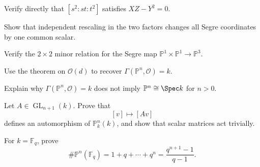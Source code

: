 \begin{exercise}\label{exr:vi36-20}
Verify directly that \([s^2:st:t^2]\) satisfies \(XZ-Y^2=0\).
\end{exercise}

\begin{exercise}\label{exr:vi36-21}
Show that independent rescaling in the two factors changes all Segre coordinates by one common scalar.
\end{exercise}

\begin{exercise}\label{exr:vi36-22}
Verify the \(2\times2\) minor relation for the Segre map \(\mathbb P^1\times\mathbb P^1\to\mathbb P^3\).
\end{exercise}

\begin{exercise}\label{exr:vi36-23}
Use the theorem on \(\mathcal O(d)\) to recover \(\Gamma(\mathbb P^n,\mathcal O)=k\).
\end{exercise}

\begin{exercise}\label{exr:vi36-24}
Explain why \(\Gamma(\mathbb P^n,\mathcal O)=k\) does not imply \(\mathbb P^n\cong\Spec k\) for \(n>0\).
\end{exercise}

\begin{exercise}\label{exr:vi36-25}
Let \(A\in\operatorname{GL}_{n+1}(k)\). Prove that
\[
[v]\longmapsto[Av]
\]
defines an automorphism of \(\mathbb P^n_k(k)\), and show that scalar matrices act trivially.
\end{exercise}

\begin{exercise}\label{exr:vi36-26}
For \(k=\mathbb F_q\), prove
\[
\#\mathbb P^n(\mathbb F_q)
=
1+q+\cdots+q^n
=
\frac{q^{n+1}-1}{q-1}.
\]
\end{exercise}
